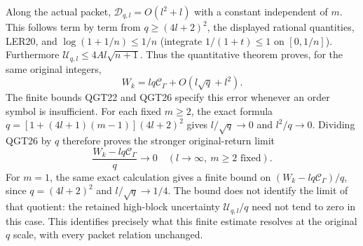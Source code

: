 Along the actual packet, $\mathcal D_{q,l}=O(l^2+l)$ with a constant
independent of $m$. This follows term by term from
$q\ge(4l+2)^2$, the displayed rational quantities, LER20, and
$\log(1+1/n)\le1/n$ (integrate $1/(1+t)\le1$ on $[0,1/n]$).
Furthermore $\mathcal U_{q,l}\le4Al\sqrt{n+1}$.
Thus the quantitative theorem proves, for the same original integers,
\[
 \boxed{W_k=lq\mathcal C_\Gamma+O(l\sqrt q+l^2).}
 \tag{QGT27}
\]
The finite bounds QGT22 and QGT26 specify this error whenever an
order symbol is insufficient.
For each fixed $m\ge2$, the exact formula
$q=[1+(4l+1)(m-1)](4l+2)^2$ gives
$l/\sqrt q\to0$ and $l^2/q\to0$. Dividing QGT26 by $q$ therefore
proves the stronger original-return limit
\[
 \boxed{\frac{W_k-lq\mathcal C_\Gamma}{q}\longrightarrow0
                        \quad(l\to\infty,\ m\ge2\text{ fixed}).}
 \tag{QGT28}
\]
For $m=1$, the same exact calculation gives a finite bound on
$(W_k-lq\mathcal C_\Gamma)/q$, since $q=(4l+2)^2$ and
$l/\sqrt q\to1/4$. The bound does not identify the limit of that
quotient: the retained high-block uncertainty
$\mathcal U_{q,l}/q$ need not tend to zero in this case.
This identifies precisely what this finite estimate resolves at the
original $q$ scale, with every packet relation unchanged.
